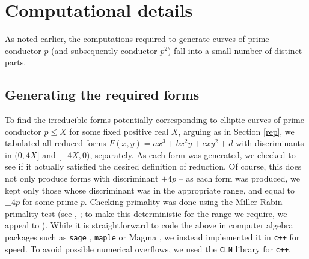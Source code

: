  \section{Computational details} \label{compy}

As noted earlier, the computations required to generate curves of prime conductor  $p$  (and subsequently conductor $p^2$) fall into a small number of 
distinct parts. 

\subsection{Generating the required forms}

To find the irreducible forms  potentially corresponding to elliptic curves of prime conductor $p \leq X$ for some fixed 
positive real $X$, arguing as in Section \ref{rep}, we tabulated all reduced forms $F(x,y)=ax^3+bx^2y+cxy^2+d$ with 
discriminants in $(0,4X]$ and $[-4X,0)$, separately. As each form was generated, we checked to see if it actually 
satisfied the desired definition of reduction. Of course, this does not only produce forms with discriminant $\pm 4p$ -- 
as each form was produced, we kept only those whose discriminant was in the appropriate range, and equal 
to $\pm 4p$ for some prime $p$. Checking primality was done using the Miller-Rabin primality test (see \cite{Mil}, 
\cite{Rab}; to make this deterministic for the range we require, we appeal to \cite{SW}). While it is straightforward to 
code the above in computer algebra packages such as \texttt{sage} \cite{Sage}, \texttt{maple} \cite{Maple} or Magma \cite{magma}, we 
instead implemented it in \texttt{c++} for speed. To avoid possible numerical overflows, we used the \texttt{CLN} 
library \cite{Hai} for \texttt{c++}. 


